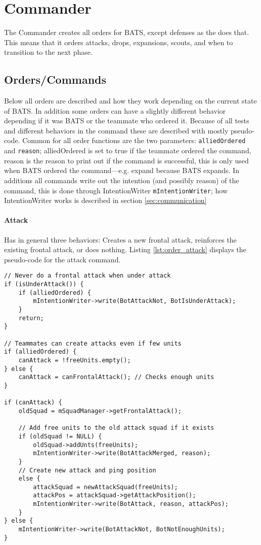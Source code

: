 \section{Commander}
\label{sec:commander}
The Commander creates all orders for BATS, except defenses as the  does that. This means that it orders attacks, drops, expansions, scouts, and when to transition to the next phase.

\subsection{Orders/Commands}
Below all orders are described and how they work depending on the current state of BATS. In addition some orders can have a slightly different behavior depending if it was BATS or the teammate who ordered it. Because of all tests and different behaviors in the command these are described with mostly pseudo-code. Common for all order functions are the two parameters: \texttt{alliedOrdered} and \texttt{reason}; alliedOrdered is set to true if the teammate ordered the command, reason is the reason to print out if the command is successful, this is only used when BATS ordered the command—e.g. expand because BATS expands. In additions all commands write out the intention (and possibly reason) of the command, this is done through IntentionWriter \texttt{mIntentionWriter}; how IntentionWriter works is described in section \ref{sec:communication}

\paragraph{Attack}
Has in general three behaviors: Creates a new frontal attack, reinforces the existing frontal attack, or does nothing. Listing \ref{lst:order_attack} displays the pseudo-code for the attack command.
\begin{lstlisting}[label={lst:order_attack},caption={Pseudo-code for the attack command}]
// Never do a frontal attack when under attack
if (isUnderAttack()) {
	if (alliedOrdered) {
		mIntentionWriter->write(BotAttackNot, BotIsUnderAttack);
	}
	return;
}

// Teammates can create attacks even if few units
if (alliedOrdered) {
	canAttack = !freeUnits.empty();
} else {
	canAttack = canFrontalAttack(); // Checks enough units
}

if (canAttack) {
	oldSquad = mSquadManager->getFrontalAttack();
	
	// Add free units to the old attack squad if it exists
	if (oldSquad != NULL) {
		oldSquad->addUnts(freeUnits);
		mIntentionWriter->write(BotAttackMerged, reason);
	}
	// Create new attack and ping position
	else {
		attackSquad = newAttackSquad(freeUnits);
		attackPos = attackSquad->getAttackPosition();
		mIntentionWriter->write(BotAttack, reason, attackPos);
	}
} else {
	mIntentionWriter->write(BotAttackNot, BotNotEnoughUnits);
}
\end{lstlisting}

